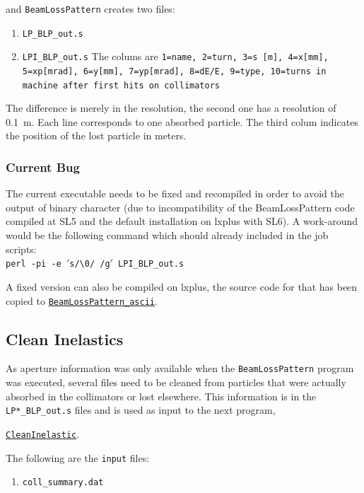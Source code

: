 \documentclass[a4paper, oneside, final]{scrartcl}
\begin{document}
{{{and \texttt{BeamLossPattern} creates two files:

\begin{enumerate}
\item \texttt{LP\_BLP\_out.s}
\item \texttt{LPI\_BLP\_out.s} The colums are \texttt{1=name, 2=turn, 3=s [m], 4=x[mm], 5=xp[mrad], 6=y[mm], 7=yp[mrad], 8=dE/E, 9=type, 10=turns in machine after first hits on collimators}
\end{enumerate}
The difference is merely in the resolution, the second one has a resolution of 0.1~m. Each line corresponds to one absorbed particle. The third colum indicates the position of the lost particle in meters. 

\subsubsection{Current Bug}
The current executable needs to be fixed and recompiled in order to avoid the output of binary character (due to incompatibility of the BeamLossPattern code compiled at SL5 and the default installation on lxplus with SL6). A work-around would be the following command which should already included in the job scripts:\\
\texttt{perl -pi -e $'$s/\textbackslash0/ /g$'$ LPI\_BLP\_out.s}\newline

A fixed version can also be compiled on lxplus, the source code for that has been copied to 
{\href{https://github.com/rkwee/LHC-Collimation/tree/master/PostSixTrack/BeamLossPattern_ascii}{\texttt{BeamLossPattern\_ascii}}}.

\subsection{Clean Inelastics}

As aperture information was only available when the \texttt{BeamLossPattern} program was executed, several files need to be cleaned from particles that were actually absorbed in the collimators or lost elsewhere. This information is in the \texttt{LP*\_BLP\_out.s} files and is used as input to the next program, {\href{https://github.com/rkwee/LHC-Collimation/tree/master/PostSixTrack/CleanInelastic}{\texttt{CleanInelastic}}.

The following are the \texttt{input} files:

\begin{enumerate}
\item \texttt{coll\_summary.dat} 


\end{enumerate}}}}}
\end{document}
